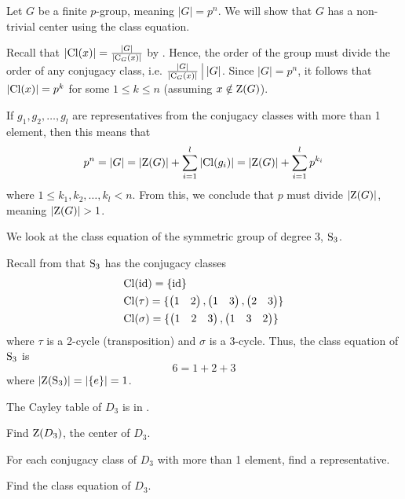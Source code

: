 \begin{example}\label{example-group-with-prime-power-order-has-non-trivial-center}
    Let $G$ be a finite $p$-group, meaning $|G| = p^n$. We will show that $G$ has a non-trivial center using the class equation.

    Recall that $|\mathrm{Cl}(x)| = \frac{|G|}{|\mathrm{C}_{G}(x)|}$ by . Hence, the order of the group must divide the order of any conjugacy class, i.e. $\frac{|G|}{|\C{G}{x}|} \vert |G|$. Since $|G| = p^n$, it follows that $|\mathrm{Cl}(x)| = p^k$ for some $1 \leq k \leq n$ (assuming $x \notin \mathrm{Z}(G)$).

    If $g_1, g_2, \dots, g_l$ are representatives from the conjugacy classes with more than 1 element, then this means that
    \[
        p^n = |G| = |\mathrm{Z}(G)| + \sum_{i=1}^l |\mathrm{Cl}(g_i)| = |\mathrm{Z}(G)| + \sum_{i=1}^l p^{k_i}
    \]
    where $1 \leq k_1, k_2, \dots, k_l < n$. From this, we conclude that $p$ must divide $|\mathrm{Z}(G)|$, meaning $|\mathrm{Z}(G)| > 1$.
\end{example}
\begin{example}
    We look at the class equation of the symmetric group of degree 3, $\mathrm{S}_{3}$.

    Recall from  that $\mathrm{S}_{3}$ has the conjugacy classes
    \begin{align*}
        &\mathrm{Cl}(\mathrm{id}) = \{\mathrm{id}\}\\
        &\mathrm{Cl}(\tau) = \{\begin{pmatrix}1 & 2\end{pmatrix}, \begin{pmatrix}1 & 3\end{pmatrix}, \begin{pmatrix}2 & 3\end{pmatrix}\}\\
        &\mathrm{Cl}(\sigma) = \{\begin{pmatrix}1 & 2 & 3\end{pmatrix}, \begin{pmatrix}1 & 3 & 2\end{pmatrix}\}
    \end{align*}
    where $\tau$ is a 2-cycle (transposition) and $\sigma$ is a 3-cycle. Thus, the class equation of $\mathrm{S}_{3}$ is
    \[
        6 = 1 + 2 + 3
    \]
    where $|\mathrm{Z}(\mathrm{S}_{3})| = |\{e\}| = 1$.  
\end{example}

\begin{exercise}
    The Cayley table of $D_3$ is in .
    \begin{partquestions}{\alph*}
        \item Find $\mathrm{Z}(D_3)$, the center of $D_3$.
        \item For each conjugacy class of $D_3$ with more than 1 element, find a representative.
        \item Find the class equation of $D_3$.
    \end{partquestions}
\end{exercise}

